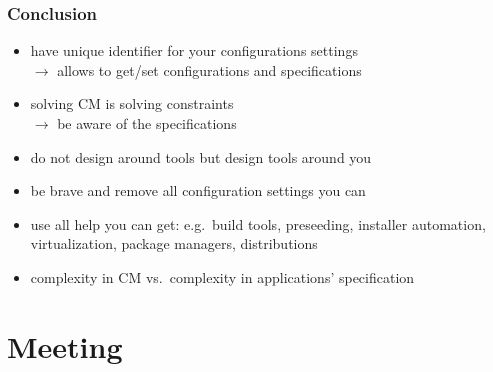 \begin{frame}
	\frametitle{Conclusion}

	\begin{itemize}[<+-| alert@+>]
	\item have unique identifier for your configurations settings \\ $\rightarrow$ allows to get/set configurations and specifications
	\item solving CM is solving constraints \\ $\rightarrow$ be aware of the specifications
	\item do not design around tools but design tools around you
	\item be brave and remove all configuration settings you can
	\item use all help you can get: e.g.\ build tools, preseeding, installer automation, virtualization, package managers, distributions
	\item complexity in CM vs.\ complexity in applications' specification
	\end{itemize}
\end{frame}



\section{Meeting}

%
%



\appendix

\begin{frame}[allowframebreaks]
	
	
\end{frame}



